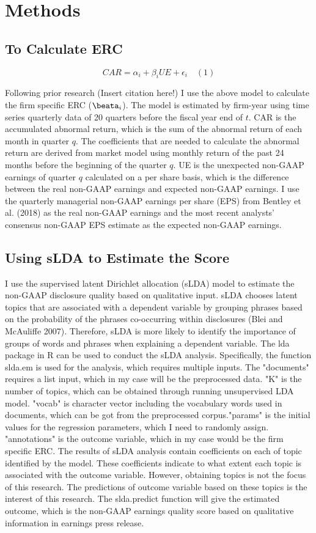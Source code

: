 \documentclass{article}
\begin{document}
\section{Methods}

\subsection{To Calculate ERC}

\[CAR=\alpha_i + \beta_i UE + \epsilon_i \quad  (1) \]

Following prior research (Insert citation here!) I use the above model to calculate the firm specific ERC ($\beata_i$). The model is estimated by firm-year using time series quarterly data of 20 quarters before the fiscal year end of $t$. CAR is the accumulated abnormal return, which is the sum of the abnormal return of each month in quarter $q$. The coefficients that are needed to calculate the abnormal return are derived from market model using monthly return of the past 24 months before the beginning of the quarter $q$. UE is the unexpected non-GAAP earnings of quarter $q$ calculated on a per share basis, which is the difference between the real non-GAAP earnings and expected non-GAAP earnings. I use the quarterly managerial non-GAAP earnings per share (EPS) from Bentley et al. (2018) as the real non-GAAP earnings and the most recent analysts' consensus non-GAAP EPS estimate as the expected non-GAAP earnings.

\subsection{Using sLDA to Estimate the Score}
I use the supervised latent Dirichlet allocation (sLDA) model to estimate the non-GAAP disclosure quality based on qualitative input. sLDA chooses latent topics that are associated with a dependent variable by grouping phrases based on the probability of the phrases co-occurring within disclosures (Blei and McAuliffe 2007). Therefore, sLDA is more likely to identify the importance of groups of words and phrases when explaining a dependent variable.
The lda package in R can be used to conduct the sLDA analysis. Specifically, the function slda.em is used for the analysis, which requires multiple inputs. The "documents" requires a list input, which in my case will be the preprocessed data. "K" is the number of topics, which can be obtained through running unsupervised LDA model. "vocab" is character vector including the vocabulary words used in documents, which can be got from the preprocessed corpus."params" is the initial values for the regression parameters, which I need to randomly assign.
"annotations" is the outcome variable, which in my case would be the firm specific ERC.
The results of sLDA analysis contain coefficients on each of topic identified by the model. These coefficients indicate to what extent each topic is associated with the outcome variable. However, obtaining topics is not the focus of this research. The predictions of outcome variable based on these topics is the interest of this research. The slda.predict function will give the estimated outcome, which is the non-GAAP earnings quality score based on qualitative information in earnings press release.
\end{document}
